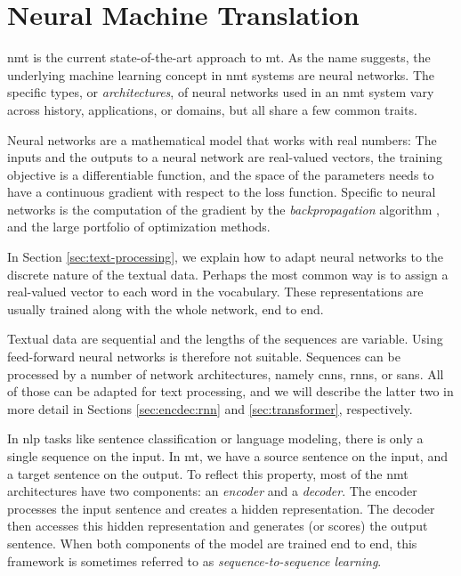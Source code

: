 \chapter{Neural Machine Translation}
\label{chap:nmt}



\Gls{nmt} is the current state-of-the-art approach to \gls{mt}. As the name
suggests, the underlying machine learning concept in \gls{nmt} systems are
neural networks. The specific types, or \emph{architectures}, of neural
networks used in an \gls{nmt} system vary across history, applications, or
domains, but all share a few common traits.

Neural networks are a mathematical model that works with real numbers: The
inputs and the outputs to a neural network are real-valued vectors, the
training objective is a differentiable function, and the space of the
parameters needs to have a continuous gradient with respect to the loss
function. Specific to neural networks is the computation of the gradient by the
\emph{backpropagation} algorithm , and the large portfolio of
optimization methods.

In Section \ref{sec:text-processing}, we explain how to adapt neural networks
to the discrete nature of the textual data. Perhaps the most common way is to
assign a real-valued vector to each word in the vocabulary. These
representations are usually trained along with the whole network, end to end.

Textual data are sequential and the lengths of the sequences are
variable. Using feed-forward neural networks is therefore not
suitable. Sequences can be processed by a number of network architectures,
namely \glspl{cnn}, \glspl{rnn}, or \glspl{san}. All of those can be adapted
for text processing, and we will describe the latter two in more detail in
Sections \ref{sec:encdec:rnn} and \ref{sec:transformer}, respectively.

In \acrshort{nlp} tasks like sentence classification or language modeling,
there is only a single sequence on the input. In \acrshort{mt}, we have a
source sentence on the input, and a target sentence on the output. To reflect
this property, most of the \gls{nmt} architectures have two components: an
\emph{encoder} and a \emph{decoder}. The encoder processes the input sentence
and creates a hidden representation. The decoder then accesses this hidden
representation and generates (or scores) the output sentence. When both
components of the model are trained end to end, this framework is sometimes
referred to as \emph{sequence-to-sequence learning}. 


